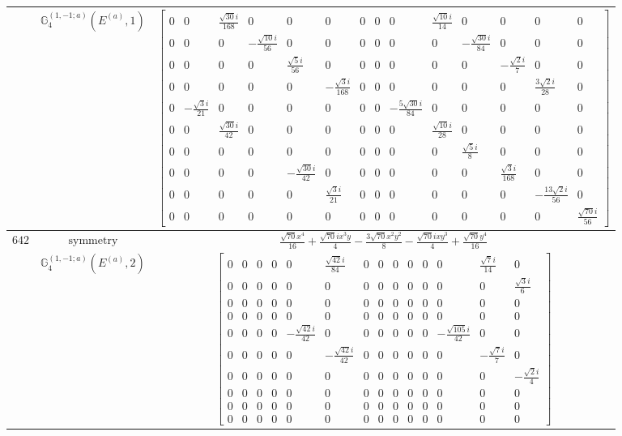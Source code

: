 \documentclass[fleqn,8pt,landscape]{jsarticle}
\begin{document}
\begin{longtable}{ccc}
$  $ & $ \mathbb{G}_{4}^{(1,-1;a)}(E^{(a)},1) $ & $ \begin{bmatrix} 0 & 0 & \frac{\sqrt{30} i}{168} & 0 & 0 & 0 & 0 & 0 & 0 & \frac{\sqrt{10} i}{14} & 0 & 0 & 0 & 0 \\ 0 & 0 & 0 & - \frac{\sqrt{10} i}{56} & 0 & 0 & 0 & 0 & 0 & 0 & - \frac{\sqrt{30} i}{84} & 0 & 0 & 0 \\ 0 & 0 & 0 & 0 & \frac{\sqrt{5} i}{56} & 0 & 0 & 0 & 0 & 0 & 0 & - \frac{\sqrt{2} i}{7} & 0 & 0 \\ 0 & 0 & 0 & 0 & 0 & - \frac{\sqrt{3} i}{168} & 0 & 0 & 0 & 0 & 0 & 0 & \frac{3 \sqrt{2} i}{28} & 0 \\ 0 & - \frac{\sqrt{3} i}{21} & 0 & 0 & 0 & 0 & 0 & 0 & - \frac{5 \sqrt{30} i}{84} & 0 & 0 & 0 & 0 & 0 \\ 0 & 0 & \frac{\sqrt{30} i}{42} & 0 & 0 & 0 & 0 & 0 & 0 & \frac{\sqrt{10} i}{28} & 0 & 0 & 0 & 0 \\ 0 & 0 & 0 & 0 & 0 & 0 & 0 & 0 & 0 & 0 & \frac{\sqrt{5} i}{8} & 0 & 0 & 0 \\ 0 & 0 & 0 & 0 & - \frac{\sqrt{30} i}{42} & 0 & 0 & 0 & 0 & 0 & 0 & \frac{\sqrt{3} i}{168} & 0 & 0 \\ 0 & 0 & 0 & 0 & 0 & \frac{\sqrt{3} i}{21} & 0 & 0 & 0 & 0 & 0 & 0 & - \frac{13 \sqrt{2} i}{56} & 0 \\ 0 & 0 & 0 & 0 & 0 & 0 & 0 & 0 & 0 & 0 & 0 & 0 & 0 & \frac{\sqrt{70} i}{56} \end{bmatrix} $ \\ \hline
$ 642 $ & $ \text{symmetry} $ & $ \frac{\sqrt{70} x^{4}}{16} + \frac{\sqrt{70} i x^{3} y}{4} - \frac{3 \sqrt{70} x^{2} y^{2}}{8} - \frac{\sqrt{70} i x y^{3}}{4} + \frac{\sqrt{70} y^{4}}{16} $ \\
$  $ & $ \mathbb{G}_{4}^{(1,-1;a)}(E^{(a)},2) $ & $ \begin{bmatrix} 0 & 0 & 0 & 0 & 0 & \frac{\sqrt{42} i}{84} & 0 & 0 & 0 & 0 & 0 & 0 & \frac{\sqrt{7} i}{14} & 0 \\ 0 & 0 & 0 & 0 & 0 & 0 & 0 & 0 & 0 & 0 & 0 & 0 & 0 & \frac{\sqrt{3} i}{6} \\ 0 & 0 & 0 & 0 & 0 & 0 & 0 & 0 & 0 & 0 & 0 & 0 & 0 & 0 \\ 0 & 0 & 0 & 0 & 0 & 0 & 0 & 0 & 0 & 0 & 0 & 0 & 0 & 0 \\ 0 & 0 & 0 & 0 & - \frac{\sqrt{42} i}{42} & 0 & 0 & 0 & 0 & 0 & 0 & - \frac{\sqrt{105} i}{42} & 0 & 0 \\ 0 & 0 & 0 & 0 & 0 & - \frac{\sqrt{42} i}{42} & 0 & 0 & 0 & 0 & 0 & 0 & - \frac{\sqrt{7} i}{7} & 0 \\ 0 & 0 & 0 & 0 & 0 & 0 & 0 & 0 & 0 & 0 & 0 & 0 & 0 & - \frac{\sqrt{2} i}{4} \\ 0 & 0 & 0 & 0 & 0 & 0 & 0 & 0 & 0 & 0 & 0 & 0 & 0 & 0 \\ 0 & 0 & 0 & 0 & 0 & 0 & 0 & 0 & 0 & 0 & 0 & 0 & 0 & 0 \\ 0 & 0 & 0 & 0 & 0 & 0 & 0 & 0 & 0 & 0 & 0 & 0 & 0 & 0 \end{bmatrix} $ \\ \hline

\end{longtable}
\end{document}

